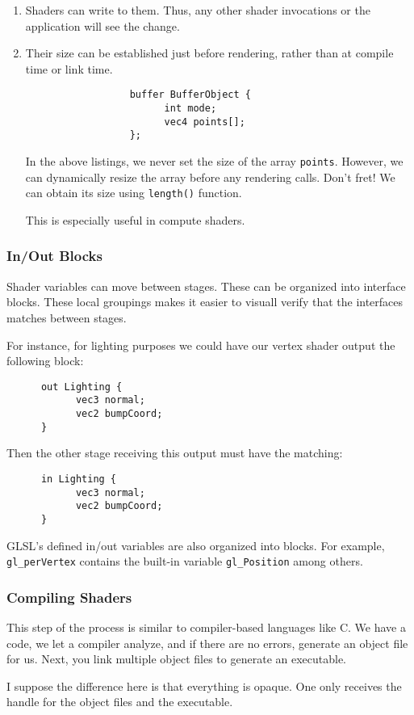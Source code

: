 \documentclass[a4paper, 12pt]{article}
\begin{document}
\begin{enumerate}

      \item
            Shaders can write to them.
            Thus, any other shader invocations or the application will see the change.
      \item
            Their size can be established just before rendering, rather than at compile time or link time.

            \begin{lstlisting}
                  buffer BufferObject {
                        int mode;
                        vec4 points[];
                  };
            \end{lstlisting}

            In the above listings, we never set the size of the array \verb|points|.
            However, we can dynamically resize the array before any rendering calls.
            Don't fret!
            We can obtain its size using \verb|length()| function.

            This is especially useful in compute shaders.

\end{enumerate}

\subsubsection{In/Out Blocks}

Shader variables can move between stages.
These can be organized into interface blocks.
These local groupings makes it easier to visuall verify that the interfaces matches between stages.

For instance, for lighting purposes we could have our vertex shader output the following block:

\begin{lstlisting}
      out Lighting {
            vec3 normal;
            vec2 bumpCoord;
      }
\end{lstlisting}

Then the other stage receiving this output must have the matching:

\begin{lstlisting}
      in Lighting {
            vec3 normal;
            vec2 bumpCoord;
      }
\end{lstlisting}

GLSL's defined in/out variables are also organized into blocks.
For example, \verb|gl_perVertex| contains the built-in variable \verb|gl_Position| among others.

\subsubsection{Compiling Shaders}

This step of the process is similar to compiler-based languages like C.
We have a code, we let a compiler analyze, and if there are no errors, generate an object file for us.
Next, you link multiple object files to generate an executable.

I suppose the difference here is that everything is opaque.
One only receives the handle for the object files and the executable.
\end{document}
